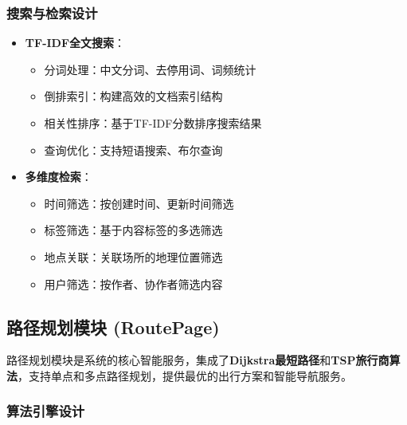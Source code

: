 \documentclass[12pt,a4paper]{article}
\begin{document}
\subsubsection{搜索与检索设计}

\begin{itemize}
    \item \textbf{TF-IDF全文搜索}：
    \begin{itemize}
        \item 分词处理：中文分词、去停用词、词频统计
        \item 倒排索引：构建高效的文档索引结构
        \item 相关性排序：基于TF-IDF分数排序搜索结果
        \item 查询优化：支持短语搜索、布尔查询
    \end{itemize}
    
    \item \textbf{多维度检索}：
    \begin{itemize}
        \item 时间筛选：按创建时间、更新时间筛选
        \item 标签筛选：基于内容标签的多选筛选
        \item 地点关联：关联场所的地理位置筛选
        \item 用户筛选：按作者、协作者筛选内容
    \end{itemize}
\end{itemize}

\subsection{路径规划模块 (RoutePage)}

\begin{designbox}[title={智能导航设计}]
路径规划模块是系统的核心智能服务，集成了\textbf{Dijkstra最短路径}和\textbf{TSP旅行商算法}，支持单点和多点路径规划，提供最优的出行方案和智能导航服务。
\end{designbox}

\subsubsection{算法引擎设计}
\end{document}
